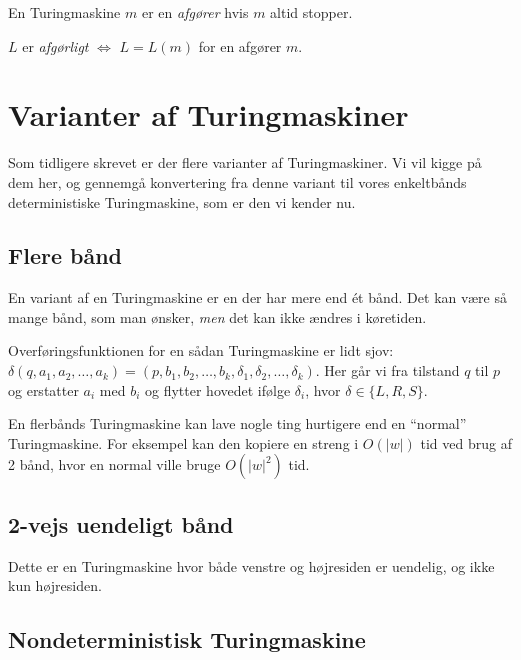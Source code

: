 \begin{definition}[Afgører]
	En Turingmaskine $m$ er en \textit{afgører} hvis $m$ altid stopper.
\end{definition}

\begin{definition}
	$L$ er \textit{afgørligt} $\iff$ $L = L(m)$ for en afgører $m$.
\end{definition}

\section{Varianter af Turingmaskiner}%
\label{sec:label}

Som tidligere skrevet er der flere varianter af Turingmaskiner. Vi vil kigge på dem her, og gennemgå konvertering fra denne variant til vores enkeltbånds deterministiske Turingmaskine, som er den vi kender nu.

\subsection{Flere bånd}%
\label{subsec:label}

En variant af en Turingmaskine er en der har mere end ét bånd. Det kan være så mange bånd, som man ønsker, \textit{men} det kan ikke ændres i køretiden.

Overføringsfunktionen for en sådan Turingmaskine er lidt sjov: $\delta(q, a_{1}, a_{2}, \ldots, a_{k}) = (p, b_{1}, b_{2}, \ldots, b_{k}, \delta_{1}, \delta_{2}, \ldots, \delta_{k})$. Her går vi fra tilstand $q$ til $p$ og erstatter $a_{i}$ med $b_{i}$ og flytter hovedet ifølge $\delta_{i}$, hvor \(\delta \in \{L, R, S\}\).

En flerbånds Turingmaskine kan lave nogle ting hurtigere end en ``normal'' Turingmaskine. For eksempel kan den kopiere en streng i $O(|w|)$ tid ved brug af 2 bånd, hvor en normal ville bruge $O(|w|^{2})$ tid.

\subsection{2-vejs uendeligt bånd}%
\label{subsec:label}

Dette er en Turingmaskine hvor både venstre og højresiden er uendelig, og ikke kun højresiden.

\subsection{Nondeterministisk Turingmaskine}%
\label{subsec:label}

